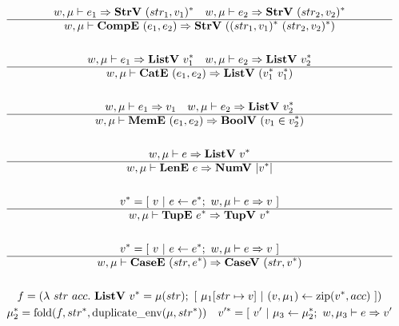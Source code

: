 \begin{gather*}
%
\newline \\
   w, \mu \vdash e_1 \Rightarrow \strv ~ \seq{(str_1, v_1)} \quad
   w, \mu \vdash e_2 \Rightarrow \strv ~ \seq{(str_2, v_2)} \\
  \hline
  w, \mu \vdash \compe ~ (e_1, e_2) \Rightarrow \strv ~ (\seq{(str_1, v_1)} ~ \seq{(str_2, v_2)}) \\
%
\newline \\
   w, \mu \vdash e_1 \Rightarrow \listv ~ \seq{v_1} \quad
   w, \mu \vdash e_2 \Rightarrow \listv ~ \seq{v_2} \\
  \hline
  w, \mu \vdash \cate ~ (e_1, e_2) \Rightarrow \listv ~ (\seq{v_1} ~ \seq{v_1}) \\
%
\newline \\
  w, \mu \vdash e_1 \Rightarrow v_1 \quad
  w, \mu \vdash e_2 \Rightarrow \listv ~ \seq{v_2} \\
  \hline
  w, \mu \vdash \meme ~ (e_1, e_2) \Rightarrow \boolv ~ (v_1 \in \seq{v_2}) \\
%
\newline \\
  w, \mu \vdash e \Rightarrow \listv ~ \seq{v} \\
  \hline
  w, \mu \vdash \lene ~ e \Rightarrow \numv ~ |\seq v| \\
%
\newline \\
  \seq{v} = [ ~ v ~ | ~ e \leftarrow \seq{e}; ~ w, \mu \vdash e \Rightarrow v ~ ] \\
  \hline
  w, \mu \vdash \tupe ~ \seq{e} \Rightarrow \tupv ~ \seq{v} \\
%
\newline \\
  \seq{v} = [ ~ v ~ | ~ e \leftarrow \seq{e}; ~ w, \mu \vdash e \Rightarrow v ~ ] \\
  \hline
  w, \mu \vdash \casee ~ (str, \seq{e}) \Rightarrow \casev ~ (str, \seq{v}) \\
%
\newline \\
  f =
    (\lambda ~ str ~ acc. ~
      \listv ~ \seq v = \mu(str); ~
      [ ~ \mu_1[str \mapsto v] ~ | ~ (v, \mu_1) \leftarrow \zip (\seq v, acc) ~ ]
    )
  \\
  \seq{\mu_2} = \fold(f, \seq{str}, \duplicateenv(\mu, \seq{str})) \quad
  \seq{v'} =
    [ ~
      v'
    ~ | ~
      \mu_3 \leftarrow \seq {\mu_2}; ~ w, \mu_3 \vdash e \Rightarrow v'

\end{gather*}
